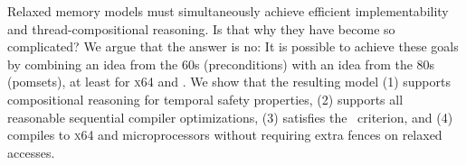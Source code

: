 Relaxed memory models must simultaneously achieve efficient implementability
and thread-compositional reasoning.  Is that why they have become so
complicated?  We argue that the answer is no: It is possible to achieve these
goals by combining an idea from the 60s (preconditions) with an idea from the
 80s (pomsets), at least for \textsc{x64} and \armeight.  We show that the
resulting model (1) supports compositional reasoning for temporal safety
properties, (2) supports all reasonable sequential compiler optimizations,
(3) satisfies the \drfsc\ criterion, and (4) compiles to \textsc{x64} and \armeight{}
microprocessors without requiring extra fences on relaxed accesses.

\endinput

Relaxed memory models must simultaneously achieve efficient implementability
and thread-compositional reasoning.  Is that why they have become so
complicated?  We argue that the answer is no: It is possible to achieve these
goals by combining an idea from the 60s (preconditions) with an idea from the
80s (pomsets), at least for X64 and ARMv8.  We show that the resulting model
(1) supports compositional reasoning for temporal safety properties, (2)
supports all reasonable sequential compiler optimizations, (3) satisfies the
DRF-SC criterion, and (4) compiles to X64 and ARMv8 microprocessors without
requiring extra fences on relaxed accesses.
